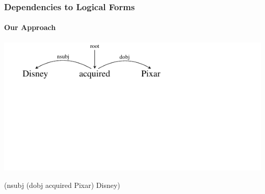 \documentclass[mathserif,12pt]{beamer}
\begin{document}
\begin{frame}[noframenumbering]
\frametitle{Dependencies to Logical Forms}
\framesubtitle{Our Approach}
\begin{center}
\includegraphics[trim=2em 9.4em 10em 0em,clip=true,scale=1.3]{figures/pixar}

\vspace{3em}
(nsubj (dobj acquired Pixar) Disney)
\vspace{3em}

\end{center}
\end{frame}
\end{document}
